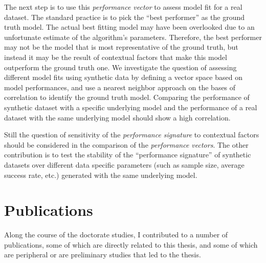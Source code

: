 The next step is to use this \textit{performance vector} to assess model fit for a real dataset. The standard practice is to pick the ``best performer'' as the ground truth model. The actual best fitting model may have been overlooked due to an unfortunate estimate of the algorithm's parameters.  Therefore, the best performer may not be the model that is most representative of the ground truth, but instead it may be the result of contextual factors that make this model outperform the ground truth one. We investigate the question of assessing different model fits using synthetic data by defining a vector space based on model performances, and use a nearest neighbor approach on the bases of correlation to identify the ground truth model. Comparing the performance of synthetic dataset with a specific underlying model and the performance of a real dataset with the same underlying model should show a high correlation. 

Still the question of sensitivity of the \textit{performance signature} to contextual factors should be considered in the comparison of the \textit{performance vectors}. The other contribution is to test the stability of the ``performance signature'' of synthetic datasets over different data specific parameters (such as sample size, average success rate, etc.) generated with the same underlying model. 


\section{Publications}

Along the course of the doctorate studies, I contributed to a number of publications, some of which are directly related to this thesis, and some of which are peripheral or are preliminary studies that led to the thesis.

